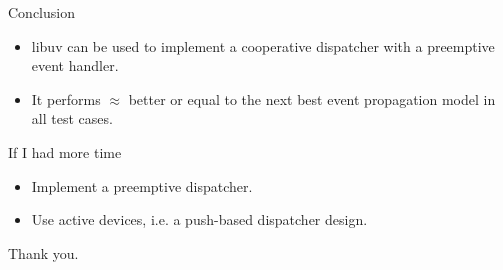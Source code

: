 \documentclass{beamer}
\begin{document}
%
%

    \begin{frame}{Conclusion}

        \begin{itemize}
            \item libuv can be used to implement a cooperative dispatcher with
                a preemptive event handler.
            \item It performs $\approx$ better or equal to the next best event
                propagation model in all test cases.
        \end{itemize}

    \end{frame}

    \begin{frame}{If I had more time}

        \begin{itemize}
            \item Implement a preemptive dispatcher.
            \item Use active devices, i.e. a push-based dispatcher design.
        \end{itemize}

    \end{frame}

    \begin{frame}
        Thank you.
    \end{frame}
\end{document}
